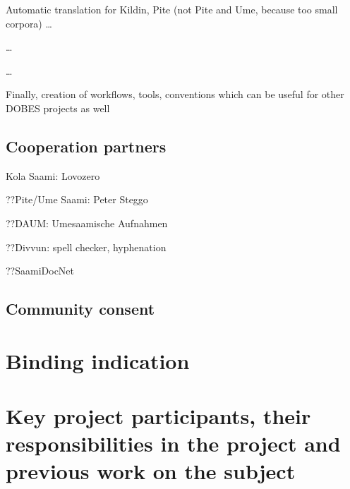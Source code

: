 \documentclass[a4paper,12pt]{article}
\begin{document}
Automatic translation for Kildin, Pite (not Pite and Ume, because too small corpora)
…

…

…

Finally, creation of workflows, tools, conventions which can be useful for other DOBES projects as well


\subsection{Cooperation partners}
Kola Saami: Lovozero

??Pite/Ume Saami: Peter Steggo%

??DAUM: Umesaamische Aufnahmen%

??Divvun: spell checker, hyphenation

??SaamiDocNet%




\subsection{Community consent}

\section{Binding indication}

\section{Key project participants, their responsibilities in the project and previous work on the subject}
\end{document}
